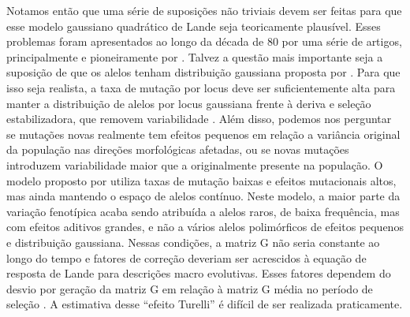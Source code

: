 Notamos então que uma série de suposições não triviais devem ser feitas
para que esse modelo gaussiano quadrático de Lande seja teoricamente
plausível.
Esses problemas foram apresentados ao longo da década de 80 por uma
série de artigos, principalmente e pioneiramente por \cite{Turelli1984,
Turelli1985, Turelli1986, Barton1987, Barton1989}.
Talvez a questão mais importante seja a suposição de que os alelos
tenham distribuição gaussiana proposta por \cite{Kimura1965}.
Para que isso seja realista, a taxa de mutação por locus deve ser
suficientemente alta para manter a distribuição de alelos por locus
gaussiana frente à deriva e seleção estabilizadora, que removem
variabilidade \citep{Falconer1996}.
Além disso, podemos nos perguntar se mutações novas realmente tem efeitos
pequenos em relação a variância original da população nas direções
morfológicas afetadas, ou se novas mutações introduzem variabilidade
maior que a originalmente presente na população.
O modelo proposto por \cite{Turelli1984} utiliza taxas de mutação
baixas e efeitos mutacionais altos, mas ainda mantendo o espaço de
alelos contínuo.
Neste modelo, a maior parte da variação fenotípica acaba sendo atribuída
a alelos raros, de baixa frequência, mas com efeitos aditivos grandes, e
não a vários alelos polimórficos de efeitos pequenos e distribuição
gaussiana.
Nessas condições, a matriz G não seria constante ao longo do tempo e
fatores de correção deveriam ser acrescidos à equação de resposta de
Lande para descrições macro evolutivas.
Esses fatores dependem do desvio por geração da matriz G em relação à
matriz G média no período de seleção \citep{Jones2004}.
A estimativa desse ``efeito Turelli'' é difícil de ser realizada
praticamente.

